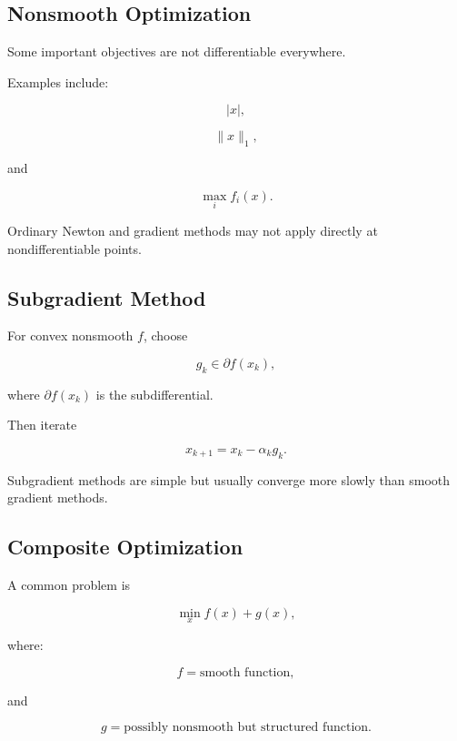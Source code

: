 \subsection{Nonsmooth Optimization}
\label{subsec:nonsmooth-numerical-optimization}

Some important objectives are not differentiable everywhere.

Examples include:

\[
\boxed{
|x|,
}
\]

\[
\boxed{
\|x\|_1,
}
\]

and

\[
\boxed{
\max_i f_i(x).
}
\]

Ordinary Newton and gradient methods may not apply directly at
nondifferentiable points.

\subsection{Subgradient Method}
\label{subsec:subgradient-method}

For convex nonsmooth \(f\), choose

\[
g_k
\in
\partial f(x_k),
\]

where \(\partial f(x_k)\) is the subdifferential.

Then iterate

\[
\boxed{
x_{k+1}
=
x_k
-
\alpha_kg_k.
}
\]

Subgradient methods are simple but usually converge more slowly than smooth
gradient methods.

\subsection{Composite Optimization}
\label{subsec:composite-optimization}

A common problem is

\[
\boxed{
\min_x
f(x)+g(x),
}
\]

where:

\[
f
=
\text{smooth function},
\]

and

\[
g
=
\text{possibly nonsmooth but structured function}.
\]

